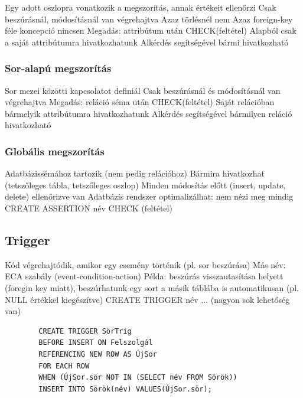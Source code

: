 \documentclass[12pt,a4paper]{article}
\begin{document}
\begin{outline}
	\1 Egy adott oszlopra vonatkozik a megszorítás, annak értékeit ellenőrzi
	\1 Csak beszúrásnál, módosításnál van végrehajtva
		\2 Azaz törlésnél nem
		\2 Azaz foreign-key féle koncepció nincsen
	\1 Megadás: attribútum után CHECK(feltétel)
		\2 Alapból csak a saját attribútumra hivatkozhatunk
		\2 Alkérdés segítségével bármi hivatkozható
\end{outline}

\subsubsection{Sor-alapú megszorítás}

\begin{outline}
	\1 Sor mezei közötti kapcsolatot definiál
	\1 Csak beszúrásnál és módosításnál van végrehajtva
	\1 Megadás: reláció séma után CHECK(feltétel)
		\2 Saját relációban bármelyik attribútumra hivatkozhatunk
		\2 Alkérdés segítségével bármilyen reláció hivatkozható
\end{outline}

\subsubsection{Globális megszorítás}

\begin{outline}
	\1 Adatbázissémához tartozik (nem pedig relációhoz)
	\1 Bármira hivatkozhat (tetszőleges tábla, tetszőleges oszlop)
	\1 Minden módosítás előtt (insert, update, delete) ellenőrizve van
		\2 Adatbázis rendszer optimalizálhat: nem nézi meg mindig
	\1 CREATE ASSERTION név CHECK (feltétel)
\end{outline}

\pagebreak

\subsection{Trigger}

\begin{outline}
	\1 Kód végrehajtódik, amikor egy esemény történik (pl. sor beszúrása)
	\1 Más név: ECA szabály (event-condition-action)
	\1 Példa: beszúrás visszautasítása helyett (foregin key miatt), beszúrhatunk egy sort a másik táblába is automatikusan (pl. NULL értékkel kiegészítve)
	\1 CREATE TRIGGER név ... (nagyon sok lehetőség van)
	\begin{verbatim}
		CREATE TRIGGER SörTrig
		BEFORE INSERT ON Felszolgál
		REFERENCING NEW ROW AS ÚjSor
		FOR EACH ROW
		WHEN (ÚjSor.sör NOT IN (SELECT név FROM Sörök))
		INSERT INTO Sörök(név) VALUES(ÚjSor.sör);
	\end{verbatim}
\end{outline}
\end{document}
